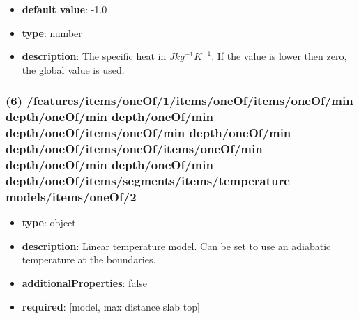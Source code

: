 \begin{itemize}[leftmargin=7em]\item {\bf default value}: -1.0
\item {\bf type}: number
\item {\bf description}: The specific heat in $J kg^{-1} K^{-1}$. If the value is lower then zero, the global value is used.
\end{itemize}\subsubsection{(6) /features/items/oneOf/1/items/oneOf/items/oneOf/min depth/oneOf/min depth/oneOf/min depth/oneOf/items/oneOf/min depth/oneOf/min depth/oneOf/items/oneOf/items/oneOf/min depth/oneOf/min depth/oneOf/min depth/oneOf/items/segments/items/temperature models/items/oneOf/2}
\begin{itemize}[leftmargin=6em]\item {\bf type}: object
\item {\bf description}: Linear temperature model. Can be set to use an adiabatic temperature at the boundaries.
\item {\bf additionalProperties}: false
\item {\bf required}: [model, max distance slab top]\end{itemize}
